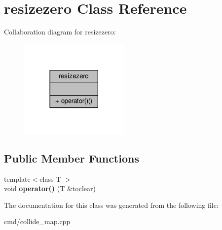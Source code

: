 \hypertarget{classresizezero}{}\section{resizezero Class Reference}
\label{classresizezero}


Collaboration diagram for resizezero\+:
\nopagebreak
\begin{figure}[H]
\begin{center}
\leavevmode
\includegraphics[width=153pt]{df/d8f/classresizezero__coll__graph}
\end{center}
\end{figure}
\subsection*{Public Member Functions}
\begin{DoxyCompactItemize}
\item 
{\footnotesize template$<$class T $>$ }\\void {\bfseries operator()} (T \&toclear)\hypertarget{classresizezero_a4651a4b8abfa3f247b4328b6f46b36cc}{}\label{classresizezero_a4651a4b8abfa3f247b4328b6f46b36cc}

\end{DoxyCompactItemize}


The documentation for this class was generated from the following file\+:\begin{DoxyCompactItemize}
\item 
cmd/collide\+\_\+map.\+cpp\end{DoxyCompactItemize}
